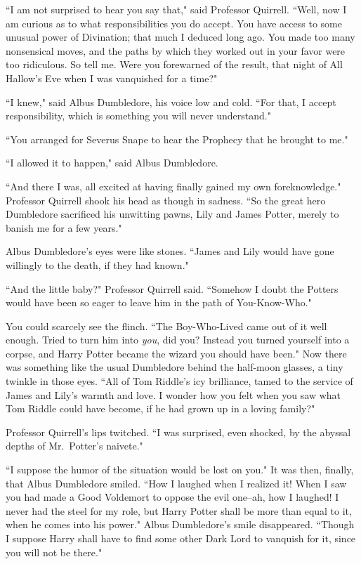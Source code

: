 ``I am not surprised to hear you say that," said Professor Quirrell. ``Well, now I am curious as to what responsibilities you do accept. You have access to some unusual power of Divination; that much I deduced long ago. You made too many nonsensical moves, and the paths by which they worked out in your favor were too ridiculous. So tell me. Were you forewarned of the result, that night of All Hallow's Eve when I was vanquished for a time?"

``I knew," said Albus Dumbledore, his voice low and cold. ``For that, I accept responsibility, which is something you will never understand."

``You arranged for Severus Snape to hear the Prophecy that he brought to me."

``I allowed it to happen," said Albus Dumbledore.

``And there I was, all excited at having finally gained my own foreknowledge." Professor Quirrell shook his head as though in sadness. ``So the great hero Dumbledore sacrificed his unwitting pawns, Lily and James Potter, merely to banish me for a few years."

Albus Dumbledore's eyes were like stones. ``James and Lily would have gone willingly to the death, if they had known."

``And the little baby?" Professor Quirrell said. ``Somehow I doubt the Potters would have been so eager to leave him in the path of You-Know-Who."

You could scarcely see the flinch. ``The Boy-Who-Lived came out of it well enough. Tried to turn him into \emph{you}, did you? Instead you turned yourself into a corpse, and Harry Potter became the wizard you should have been." Now there was something like the usual Dumbledore behind the half-moon glasses, a tiny twinkle in those eyes. ``All of Tom Riddle's icy brilliance, tamed to the service of James and Lily's warmth and love. I wonder how you felt when you saw what Tom Riddle could have become, if he had grown up in a loving family?"

Professor Quirrell's lips twitched. ``I was surprised, even shocked, by the abyssal depths of Mr.~Potter's naivete."

``I suppose the humor of the situation would be lost on you." It was then, finally, that Albus Dumbledore smiled. ``How I laughed when I realized it! When I saw you had made a Good Voldemort to oppose the evil one\---ah, how I laughed! I never had the steel for my role, but Harry Potter shall be more than equal to it, when he comes into his power." Albus Dumbledore's smile disappeared. ``Though I suppose Harry shall have to find some other Dark Lord to vanquish for it, since you will not be there."

